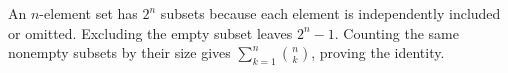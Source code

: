 An $n$-element set has $2^n$ subsets because each element is independently included or omitted. Excluding the empty subset leaves $2^n-1$. Counting the same nonempty subsets by their size gives $\sum_{k=1}^n\binom nk$, proving the identity.
